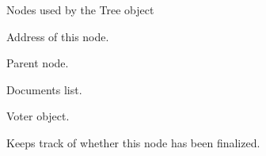 \documentclass[letterpaper,10pt,english]{sphinxmanual}
\begin{document}
\begin{fulllineitems}
\label{\detokenize{index:ThresTree.TreeNode}}
Nodes used by the Tree object

\begin{fulllineitems}
\label{\detokenize{index:ThresTree.TreeNode.addr}}
 \textendash{} Address of this node.

\end{fulllineitems}


\begin{fulllineitems}
\label{\detokenize{index:ThresTree.TreeNode.parent}}
 \textendash{} Parent node.

\end{fulllineitems}


\begin{fulllineitems}
\label{\detokenize{index:ThresTree.TreeNode.documents}}
 \textendash{} Documents list.

\end{fulllineitems}


\begin{fulllineitems}
\label{\detokenize{index:ThresTree.TreeNode.voter}}
 \textendash{} Voter object.

\end{fulllineitems}


\begin{fulllineitems}
\label{\detokenize{index:ThresTree.TreeNode.finalized}}
 \textendash{} Keeps track of whether this node has been finalized.

\end{fulllineitems}



\end{fulllineitems}
\end{document}
